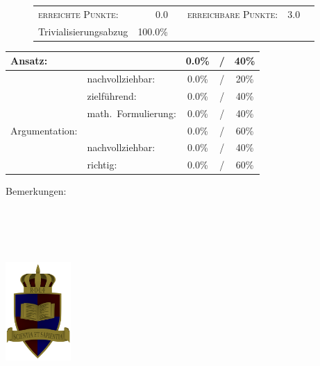 \documentclass{article}
\begin{document}
\vspace{-0.5cm}
\begin{figure}[h!]
\begin{tabular}{lrcrcr}
\textsc{erreichte Punkte:} &0.0& & \textsc{erreichbare Punkte:} &3.0\\
\small Trivialisierungsabzug  & 100.0\% & & &
\end{tabular}
\end{figure}
\vspace{-0.1cm}
\begin{minipage}[t]{0.6\textwidth}
\flushleft
\begin{tabular}{l|lccc}
Ansatz:& &0.0\%&/&40\%\\\hline
&nachvollziehbar:&0.0\%&/&20\%\\
&zielf{\"u}hrend:&0.0\%&/&40\%\\
&math.~Formulierung:& 0.0\%&/&40\%\\\hline\hline
Argumentation:& &0.0\%&/&60\%\\\hline
&nachvollziehbar:&0.0\%&/&40\%\\
&richtig:&0.0\%&/&60\%\\\hline
\end{tabular}
\end{minipage}
\hfill
\begin{minipage}[t]{0.4\textwidth}
	\vspace{-1.75cm}
	Bemerkungen:\\\vspace*{0.2cm}
	\underline{\hspace{0.95\textwidth}}\\\vspace*{0.2cm}
	\underline{\hspace{0.95\textwidth}}
	\\\vspace*{0.2cm}
	\underline{\hspace{0.95\textwidth}}
	\\\vspace*{0.2cm}
	\underline{\hspace{0.95\textwidth}}
	\\\vspace*{0.2cm}
	\underline{\hspace{0.95\textwidth}}
\end{minipage}
	\vspace{0.5cm}\clearpage\vspace*{-2cm}
\parbox{4cm}{\includegraphics[width=2.5cm]{../images/ROLF4.png}}
\end{document}
